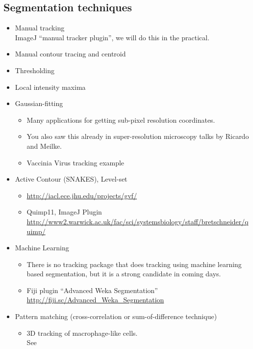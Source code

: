 \documentclass[11pnt]{article}
\begin{document}
\subsection{Segmentation techniques}
\begin{itemize}
\item Manual tracking\\
ImageJ ``manual tracker plugin'', we will do this in the practical.
\item Manual contour tracing and centroid
\item Thresholding
\item Local intensity maxima
\item Gaussian-fitting
\begin{itemize}
\item Many applications for getting sub-pixel resolution coordinates.
\item You also saw this already in super-resolution microscopy talks by Ricardo and Meilke. 
\item Vaccinia Virus tracking example
\end{itemize}
\item Active Contour (SNAKES), Level-set
\begin{itemize} 
\item \url{http://iacl.ece.jhu.edu/projects/gvf/}
\item Quimp11, ImageJ Plugin\\ \url{http://www2.warwick.ac.uk/fac/sci/systemsbiology/staff/bretschneider/quimp/}
\end{itemize}
\item Machine Learning
\begin{itemize}
\item There is no tracking package that does tracking using machine learning based segmentation, but it is a strong candidate in coming days. 
\item Fiji plugin ``Advanced Weka Segmentation''\\
\url{http://fiji.sc/Advanced_Weka_Segmentation}
\end{itemize}
\item Pattern matching (cross-correlation or sum-of-difference technique)
\begin{itemize}
\item 3D tracking of macrophage-like cells. \\See \cite{Grabher2007}
\end{itemize}
\end{itemize}
\end{document}
